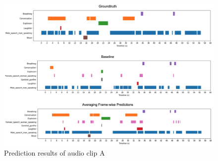 \begin{figure}[!htb]
    \centering
    \includegraphics[width=\textwidth]{fig/audio_clip_1_result.png}
    \caption{Prediction results of audio clip A}
    \label{fig:audio_clip_1_result}
\end{figure}

\FloatBarrier %


\newpage
